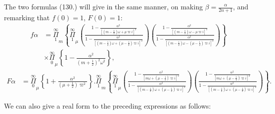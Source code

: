 \documentclass{article}
\begin{document}
The two formulas (130.) will give in the same manner, on making $\beta=\frac{\alpha}{2n+1}$, and remarking that $f(0)=1$, $F(0)=1$:
\[ \begin{aligned}f\alpha&=\overset{\infty}{\underset{1}{\Pi}}_{m}\left\{\overset{\infty}{\underset{1}{\Pi}}_{\mu}\left(\frac{1-\frac{\alpha^{2}}{[(m-\tfrac{1}{2})\omega+\mu\varpi i]^{2}}}{1-\frac{\alpha^{2}}{[(m-\tfrac{1}{2})\omega+(\mu-\tfrac{1}{2})\varpi i]^{2}}}\right)\left(\frac{1-\frac{\alpha^{2}}{[(m-\tfrac{1}{2})\omega-\mu\varpi i]^{2}}}{1-\frac{\alpha^{2}}{[(m-\tfrac{1}{2})\omega-(\mu-\tfrac{1}{2})\varpi i]^{2}}}\right)\right\}\\ &\times\overset{\infty}{\underset{0}{\Pi}}_{\mu}\left\{1-\frac{\alpha^{2}}{(m+\tfrac{1}{2})^{2}\omega^{2}}\right\},\end{aligned} \tag{176.} \]
\[ \begin{aligned}F\alpha&=\overset{\infty}{\underset{0}{\Pi}}_{\mu}\left\{1+\frac{\alpha^{2}}{(\mu+\tfrac{1}{2})\varpi^{2}}\right\}.\overset{\infty}{\underset{1}{\Pi}}_{m}\left\{\overset{\infty}{\underset{1}{\Pi}}_{\mu}\left(\frac{1-\frac{\alpha^{2}}{[m\omega+(\mu-\tfrac{1}{2})\varpi i]^{2}}}{1-\frac{\alpha^{2}}{[(m-\tfrac{1}{2})\omega+(\mu-\tfrac{1}{2})\varpi i]^{2}}}\right)\left(\frac{1-\frac{\alpha^{2}}{[m\omega+(\mu-\tfrac{1}{2})\varpi i]^{2}}}{1-\frac{\alpha^{2}}{[(m-\tfrac{1}{2})\omega+(\mu-\tfrac{1}{2})\varpi i]^{2}}}\right)\right\}.\end{aligned} \tag{177.} \]

We can also give a real form to the preceding expressions as follows:
\end{document}
